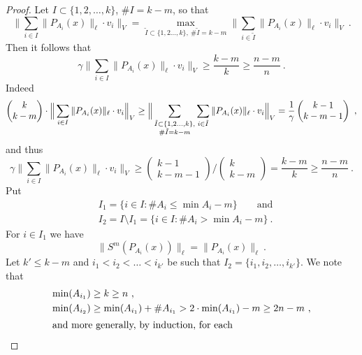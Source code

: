 \documentclass[11pt,leqno]{amsart}
\theoremstyle{definition}
\begin{document}
\begin{proof}
  Let $I\subset \{1,2,\ldots,k\}$, $\#I=k-m$, so that
  $$\Big\|\sum_{i\in I} \|P_{A_i}(x)\|_\ell\cdot v_i\Big\|_V=
  \max_{\tilde I\subset\{1,2\ldots,k\},\ \#\tilde I=k-m}
  \Big\|\sum_{i\in\tilde I} \|P_{A_i}(x)\|_\ell\cdot v_i\Big\|_V\ .$$
  Then it follows that
  $$\gamma\Big\|\sum_{i\in I} \|P_{A_i}(x)\|_\ell\cdot v_i\Big\|_V\geq
  \frac{k-m}{k}\geq \frac{n-m}{n}\ .$$
  Indeed
  \begin{equation*}
    \left(\begin{matrix} k\\ k-m\end{matrix}\right)\cdot
      \Big\|\sum_{i\in I} \|P_{A_i}(x)\|_\ell\cdot v_i\Big\|_V
      \ge\Big\|\sum_{%
	\begin{subarray}{c}
	  \tilde I\subset\{1,2\ldots ,k\},\\
	  \#\tilde I=k-m
      \end{subarray}}%
      \sum_{i\in\tilde  I} \|P_{A_i}(x)\|_\ell\cdot v_i\Big\|_V=
      \frac1\gamma\left(\begin{matrix} k-1\\
	k-m-1\end{matrix}\right)\ ,
  \end{equation*}
  and thus
  \begin{equation*}
    \gamma\Big\|\sum_{i\in I} \|P_{A_i}(x)\|_\ell\cdot v_i\Big\|_V\ge
    \left(\begin{matrix} k-1\\ k-m-1\end{matrix}\right)
      \Big/\left(\begin{matrix} k\\ k-m\end{matrix}\right)
	=\frac{k-m}{k}\ge \frac{n-m}{n}\ .
  \end{equation*}
  Put
  \begin{align*}
    &I_1=\{i\in I : \#A_i\le\min A_i-m\}\qquad\text{and}\\
    &I_2=I\setminus I_1=\{i\in I : \#A_i >\min
    A_i-m\}\ .
  \end{align*}
  For $i\in I_1$ we have
  $$\|S^{m}(P_{A_i}(x))\|_\ell=\|P_{A_i}(x)\|_\ell\ .$$
  Let $k'\leq k-m$ and $i_1<i_2<\dots<i_{k'}$ be such that
  $I_2=\{i_1,i_2,\ldots,i_{k'}\}$. We note that
  \begin{align*}
    \min(A_{i_1})&\ge k\ge n\ ,\\
    \min(A_{i_2})&\ge \min(A_{i_1})+\#A_{i_1}>
    2\cdot\min(A_{i_1})-m\ge 2n-m\ ,\\
    \intertext{and more generally, by induction, for each
}
\end{align*}
\end{proof}
\end{document}
